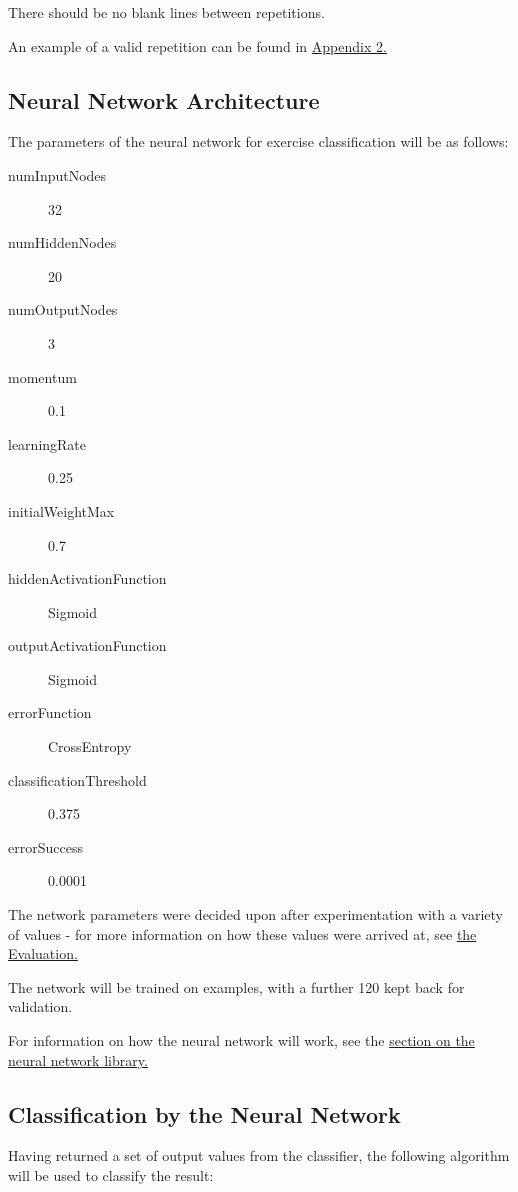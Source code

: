 \documentclass[a4paper]{article}
\begin{document}
There should be no blank lines between repetitions.

An example of a valid repetition can be found in \hyperref[subsubsec:a2_lf_normalised]{Appendix 2.}

\subsection{Neural Network Architecture}%
\label{subsec:dc_networkarchitecture}

The parameters of the neural network for exercise classification will be as follows:

\begin{description}
\item[numInputNodes] 32
\item[numHiddenNodes] 20
\item[numOutputNodes] 3
\item[momentum] 0.1
\item[learningRate] 0.25
\item[initialWeightMax] 0.7
\item[hiddenActivationFunction] Sigmoid
\item[outputActivationFunction] Sigmoid
\item[errorFunction] CrossEntropy
\item[classificationThreshold] 0.375
\item[errorSuccess] 0.0001
\end{description}


The network parameters were decided upon after experimentation with a variety of values - for more information on how these values were arrived at, see \hyperref[subsubsec:ev_cp_parameterchoice]{the Evaluation.}

The network will be trained on  examples, with a further 120 kept back for validation.

For information on how the neural network will work, see the \hyperref[sec:dn]{section on the neural network library.}

\subsection{Classification by the Neural Network}%
\label{subsec:dc_classification}

Having returned a set of output values from the classifier, the following algorithm will be used to classify the result:
\end{document}
